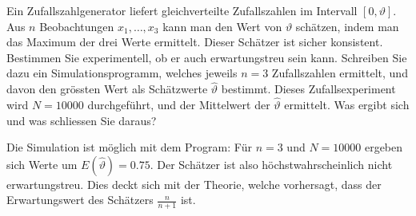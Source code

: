 Ein Zufallszahlgenerator liefert gleichverteilte Zufallszahlen im
Intervall $[0,\vartheta]$. Aus $n$ Beobachtungen $x_1,\dots,x_3$ kann
man den Wert von $\vartheta$ schätzen, indem man das Maximum der
drei Werte ermittelt. Dieser Schätzer ist sicher konsistent.
Bestimmen Sie experimentell, ob er auch erwartungstreu sein kann.
Schreiben Sie dazu ein Simulationsprogramm, welches jeweils $n=3$
Zufallszahlen ermittelt, und davon den grössten Wert als
Schätzwerte $\hat\vartheta$ bestimmt.
Dieses Zufallsexperiment wird $N=10000$ durchgeführt, und der Mittelwert
der $\hat\vartheta$ ermittelt. Was ergibt sich und was schliessen Sie
daraus?


\begin{loesung}
Die Simulation ist möglich mit dem Program:
{\small
{}
}
Für $n=3$ und $N=10000$ ergeben sich Werte  um $E(\hat\vartheta)=0.75$.
Der Schätzer ist also höchstwahrscheinlich nicht erwartungstreu.
Dies deckt sich mit der Theorie, welche vorhersagt, dass der Erwartungswert
des Schätzers $\frac{n}{n+1}$ ist.
\end{loesung}

